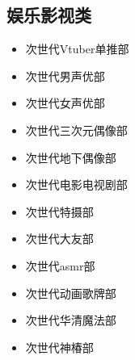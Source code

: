 \documentclass[twoside,12pt]{book}
\newenvironment{categorysection}[1]{
  \subsection*{\textcolor{truepurple}{#1}}
  \begin{itemize}[leftmargin=*, 
                 nosep,               %
                 itemsep=2pt,         %
                 parsep=0pt,          %
                 before=\setlength{\baselineskip}{23pt} %
  ]
}{
  \end{itemize}
}
\begin{document}
\begin{multicols}{3}
    \begin{categorysection}{娱乐影视类}
        \item 次世代Vtuber单推部
        \item 次世代男声优部
        \item 次世代女声优部
        \item 次世代三次元偶像部
        \item 次世代地下偶像部
        \item 次世代电影电视剧部
        \item 次世代特摄部
        \item 次世代大友部
        \item 次世代asmr部
        \item 次世代动画歌牌部
        \item 次世代华清魔法部
        \item 次世代神椿部
    \end{categorysection}


\end{multicols}
\end{document}
